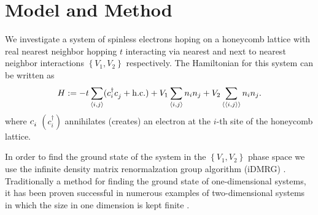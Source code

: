 \documentclass[aps,prx,10pt,twocolumn,floatfix,superscriptaddress,showpacs,numerical,footinbib]{revtex4-1}
\newcommand{\bs}[1]{{\boldsymbol{#1}}}
\begin{document}
\section{\label{sec:modandmeth}Model and Method}
%
We investigate a system of spinless electrons hoping on a honeycomb lattice with real nearest neighbor hopping $t$ interacting via nearest and next to nearest neighbor interactions 
$\left\lbrace V_{1},V_{2}\right\rbrace$ respectively. 
%
The Hamiltonian for this system can be written as
%
%
\begin{equation}
 H:=-t\sum_{\left\langle i,j\right\rangle}(c^{\dagger}_{i}c^{\vphantom{\dagger}}_{j}+ \mathrm{h.c.})+
V_{1}\sum_{\left\langle i,j\right\rangle }n_{i}n_{j}+
V_{2}\sum_{\left\langle \left\langle i,j\right\rangle \right\rangle }n_{i}n_{j}.
\label{eq:H}
\end{equation}
%
where $c_{i}^{\vphantom{\dagger}}$ $(c^{\dagger}_{i})$  annihilates (creates) an electron at the $i$-th site of the honeycomb lattice.
%
%

In order to find the ground state of the system in the $\left\lbrace V_{1},V_{2}\right\rbrace$ phase space
we use the infinite density matrix renormalzation group algorithm (iDMRG) \cite{M08,W92,KZM13}. Traditionally a method for finding the ground state of one-dimensional systems, it has been proven successful in numerous examples of two-dimensional systems in which the size in one dimension is kept finite \cite{papers}. 
\end{document}
